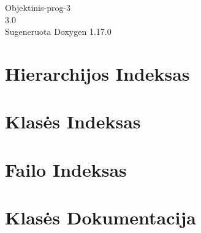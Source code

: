 \documentclass[twoside]{book}
\newcommand{\+}{\discretionary{\mbox{\scriptsize$\hookleftarrow$}}{}{}}
\newcommand{\clearemptydoublepage}{%
    \newpage{\pagestyle{empty}\cleardoublepage}%
  }
\begin{document}
  \raggedbottom
    \hypersetup{pageanchor=false,
                bookmarksnumbered=true,
                pdfencoding=unicode
               }
  \begin{titlepage}
  \vspace*{7cm}
  \begin{center}%
  {\Large Objektinis-\/prog-\/3}\\
  [1ex]\large 3.\+0 \\
  \vspace*{1cm}
  {\large Sugeneruota Doxygen 1.17.0}\\
  \end{center}
  \end{titlepage}
  \clearemptydoublepage
  \tableofcontents
  \clearemptydoublepage
  \hypersetup{pageanchor=true}
\chapter{Hierarchijos Indeksas}

\chapter{Klasės Indeksas}

\chapter{Failo Indeksas}

\chapter{Klasės Dokumentacija}




\end{document}
